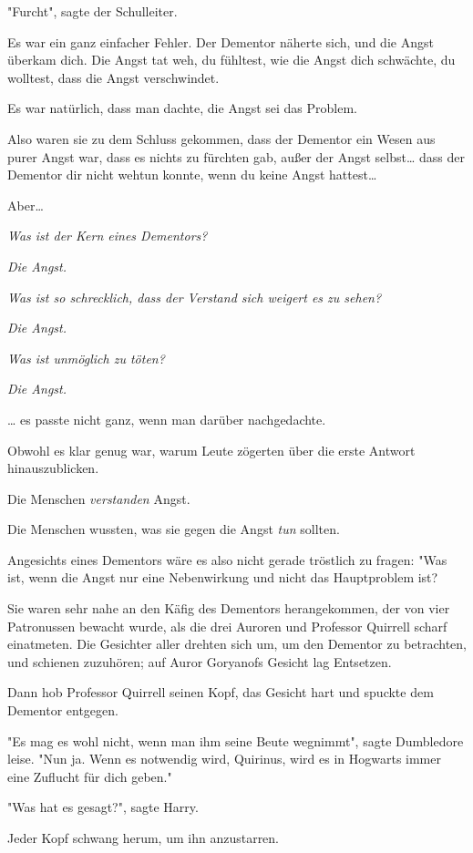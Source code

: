{"Furcht", sagte der Schulleiter.

Es war ein ganz einfacher Fehler. Der Dementor näherte sich, und die Angst überkam dich. Die Angst tat weh, du fühltest, wie die Angst dich schwächte, du wolltest, dass die Angst verschwindet.

Es war natürlich, dass man dachte, die Angst sei das Problem.

Also waren sie zu dem Schluss gekommen, dass der Dementor ein Wesen aus purer Angst war, dass es nichts zu fürchten gab, außer der Angst selbst… dass der Dementor dir nicht wehtun konnte, wenn du keine Angst hattest…

Aber…

\emph{Was ist der Kern eines Dementors?}

\emph{Die Angst.}

\emph{Was ist so schrecklich, dass der Verstand sich weigert es zu sehen?}

\emph{Die Angst.}

\emph{Was ist unmöglich zu töten?}

\emph{Die Angst.}

… es passte nicht ganz, wenn man darüber nachgedachte.

Obwohl es klar genug war, warum Leute zögerten über die erste Antwort hinauszublicken.

Die Menschen \emph{verstanden} Angst.

Die Menschen wussten, was sie gegen die Angst \emph{tun} sollten.

Angesichts eines Dementors wäre es also nicht gerade tröstlich zu fragen: "Was ist, wenn die Angst nur eine Nebenwirkung und nicht das Hauptproblem ist?

Sie waren sehr nahe an den Käfig des Dementors herangekommen, der von vier Patronussen bewacht wurde, als die drei Auroren und Professor Quirrell scharf einatmeten. Die Gesichter aller drehten sich um, um den Dementor zu betrachten, und schienen zuzuhören; auf Auror Goryanofs Gesicht lag Entsetzen.

Dann hob Professor Quirrell seinen Kopf, das Gesicht hart und spuckte dem Dementor entgegen.

"Es mag es wohl nicht, wenn man ihm seine Beute wegnimmt", sagte Dumbledore leise. "Nun ja. Wenn es notwendig wird, Quirinus, wird es in Hogwarts immer eine Zuflucht für dich geben."

"Was hat es gesagt?", sagte Harry.

Jeder Kopf schwang herum, um ihn anzustarren.

}
